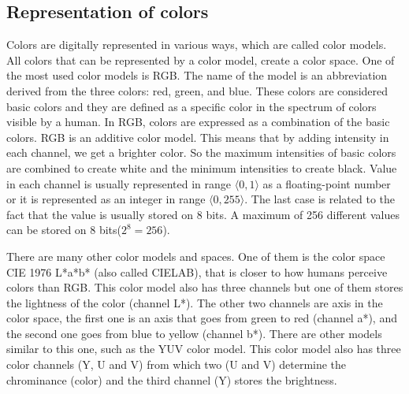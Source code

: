 \documentclass[thesis=B,english]{FITthesis}[2019/12/23]
\begin{document}
        \subsection{Representation of colors}
            Colors are digitally represented in various ways, which are called color models. All colors that can be represented by a color model, create a color space. One of the most used color models is RGB. The name of the model is an abbreviation derived from the three colors: red, green, and blue. These colors are considered basic colors and they are defined as a specific color in the spectrum of colors visible by a human. In RGB, colors are expressed as a combination of the basic colors. RGB is an additive color model. This means that by adding intensity in each channel, we get a brighter color. So the maximum intensities of basic colors are combined to create white and the minimum intensities to create black. Value in each channel is usually represented in range \(\langle 0, 1\rangle\) as a floating-point number or it is represented as an integer in range \(\langle 0, 255\rangle\). The last case is related to the fact that the value is usually stored on 8 bits. A maximum of 256 different values can be stored on 8 bits(\(2^8 = 256\)).
            
            There are many other color models and spaces. One of them is the color space CIE 1976 L*a*b* (also called CIELAB), that is closer to how humans perceive colors than RGB. This color model also has three channels but one of them stores the lightness of the color (channel L*). The other two channels are axis in the color space, the first one is an axis that goes from green to red (channel a*), and the second one goes from blue to yellow (channel b*). There are other models similar to this one, such as the YUV color model. This color model also has three color channels (Y, U and V) from which two (U and V) determine the chrominance (color) and the third channel (Y) stores the brightness.
\end{document}
